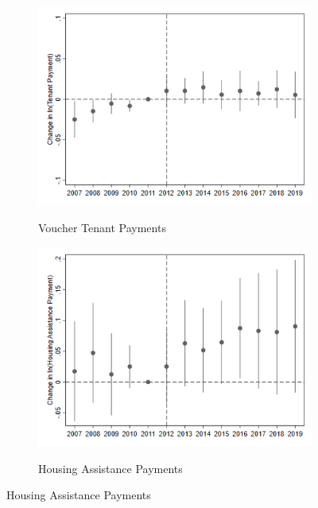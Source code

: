 \documentclass[12pt]{article}
\begin{document}
{{{{{{%

\begin{figure}[h!]
\begin{center}
\caption{Impacts on Tenant and Housing Assistance Payments in High Surge Areas}
\begin{subfigure}[b]{0.4\textwidth}
\caption{Voucher Tenant Payments}
\includegraphics[scale = 0.48]{Voucher Incidence/R3 High Surge TTP_existing.png}
\label{fig:highsurgettp}
\end{subfigure}
\hfill
\begin{subfigure}[b]{0.4\textwidth}
\caption{Housing Assistance Payments}
\includegraphics[scale = 0.48]{Voucher Incidence/R3 High Surge HAPs_existing.png}
\label{fig:highsurgehap}
\end{subfigure}
\end{center}
\end{figure}


}}}}}}
\end{document}
